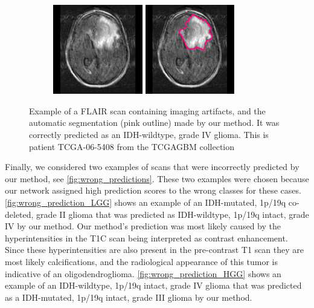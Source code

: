\begin{figure}[htbp]
    \centering
    \begin{subfigure}[b]{\textwidth}
        \centering
        \hfill
        \includegraphics[width=0.43\textwidth, clip, trim=2.5cm 0cm 2.5cm 0cm]{Figures/TCGA-06-5408_FLAIR.png}
        \hfill
        \includegraphics[width=0.43\textwidth, clip, trim=2.5cm 0cm 2.5cm 0cm]{Figures/TCGA-06-5408_FLAIR_MASK.png}
        \hfill
    \end{subfigure}
    \caption{Example of a \acrshort{FLAIR} scan containing imaging artifacts, and the automatic segmentation (pink outline) made by our method.
    It was correctly predicted as an \acrshort{IDH}-wildtype, grade IV glioma. This is patient TCGA-06-5408 from the \acrshort{TCGAGBM} collection}\label{fig:low_quality}
\end{figure}

Finally, we considered two examples of scans that were incorrectly predicted by our method, see \cref{fig:wrong_predictions}.
These two examples were chosen because our network assigned high prediction scores to the wrong classes for these cases.
\cref{fig:wrong_prediction_LGG} shows an example of an \gls{IDH}-mutated, 1p/19q co-deleted, grade II glioma that was predicted as \gls{IDH}-wildtype, 1p/19q intact, grade IV by our method.
Our method's prediction was most likely caused by the hyperintensities in the \gls{T1C} scan being interpreted as contrast enhancement.
Since these hyperintensities are also present in the pre-contrast \gls{T1} scan they are most likely calcifications, and the radiological appearance of this \gls{tumor} is indicative of an oligodendroglioma.
\cref{fig:wrong_prediction_HGG} shows an example of an \gls{IDH}-wildtype, 1p/19q intact, grade IV glioma that was predicted as a \gls{IDH}-mutated, 1p/19q intact, grade III glioma by our method.

